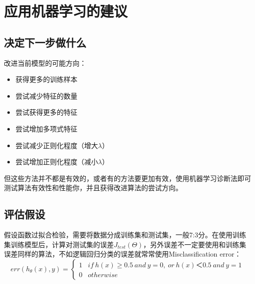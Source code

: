 \documentclass[../main.tex]{subfiles}
\begin{document}
\chapter{应用机器学习的建议}
\section{决定下一步做什么}
改进当前模型的可能方向：
\begin{itemize}
    \item 获得更多的训练样本
    \item 尝试减少特征的数量
    \item 尝试获得更多的特征
    \item 尝试增加多项式特征
    \item 尝试减少正则化程度（增大\(λ\)）
    \item 尝试增加正则化程度（减小\(λ\)）
\end{itemize}
但这些方法并不都是有效的，或者有的方法要更加有效，使用机器学习诊断法即可测试算法有效性和性能你，并且获得改进算法的尝试方向。

\section{评估假设}
假设函数过拟合检验，需要将数据分成训练集和测试集，一般7:3分。在使用训练集训练模型后，计算对测试集的误差\(J_{test}(Θ)\)，另外误差不一定要使用和训练集误差同样的算法，不如逻辑回归分类的误差就常常使用Misclassification error：\[
    err(h_θ(x), y) = \begin{cases}
        1 & if\ h(x)≥0.5\ and\ y=0,\ or\ h(x)＜0.5\ and\ y=1 \\
        0 & otherwise
    \end{cases}
\]
\end{document}
